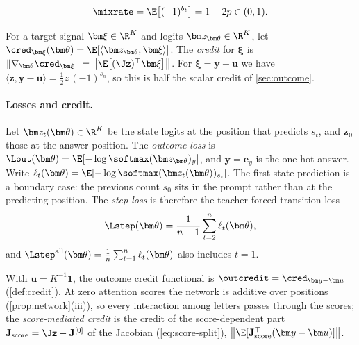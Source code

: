 \begin{definition}
\label{def:lambda}
\begin{equation}
 \mixrate=\E\bigl[(-1)^{b_t}\bigr]=1-2p\in(0,1).
 \label{eq:lambda}
\end{equation}
\end{definition}

\begin{definition}[Credit]
\label{def:credit}
For a target signal $\bm\xi\in\R^K$ and logits $\bm z_{\bm\theta}\in\R^K$, let $\cred_{\bm\xi}(\bm\theta)=\E[\langle\bm z_{\bm\theta},\bm\xi\rangle]$.
The \emph{credit} for $\bm\xi$ is $\|\nabla_{\bm\theta}\cred_{\bm\xi}\|=\bigl\|\E\bigl[(\Jz)^\top\bm\xi\bigr]\bigr\|$.
For $\bm\xi=\bm y-\bm u$ we have $\langle\bm z,\bm y-\bm u\rangle=\frac12 z\,(-1)^{s_n}$, so this is half the scalar credit of \cref{sec:outcome}.
\end{definition}

\paragraph{Losses and credit.}

\begin{definition}
\label{def:losses}
Let $\bm z_t(\bm\theta)\in\R^K$ be the state logits at the position that predicts $s_t$, and $\bm z_{\bm\theta}$
those at the answer position. The \emph{outcome loss} is $\Lout(\bm\theta)=\E[-\log\softmax(\bm z_{\bm\theta})_y]$, and $\bm y=\bm e_y$ is the one-hot answer.
Write $\ell_t(\bm\theta)=\E[-\log\softmax(\bm z_t(\bm\theta))_{s_t}]$. The first state prediction is a boundary case: the previous
count $s_0$ sits in the prompt rather than at the predicting position. The \emph{step loss} is therefore the teacher-forced
transition loss
\[
 \Lstep(\bm\theta)=\frac{1}{n-1}\sum_{t=2}^n\ell_t(\bm\theta),
\]
and $\Lstep^{\mathrm{all}}(\bm\theta)=\tfrac{1}{n}\sum_{t=1}^n\ell_t(\bm\theta)$ also includes $t=1$.
\end{definition}

With $\bm u=K^{-1}\bm 1$, the outcome credit functional is $\outcredit=\cred_{\bm y-\bm u}$ (\cref{def:credit}). At zero
attention scores the network is additive over positions (\cref{prop:network}(iii)), so every interaction among letters passes through the
scores; the \emph{score-mediated credit} is the credit of the score-dependent part $\mathbf J_{\mathrm{score}}=\Jz-\mathbf J^{[0]}$ of the Jacobian (\cref{eq:score-split}),
$\bigl\|\E[\mathbf J_{\mathrm{score}}^\top(\bm y-\bm u)]\bigr\|$.

